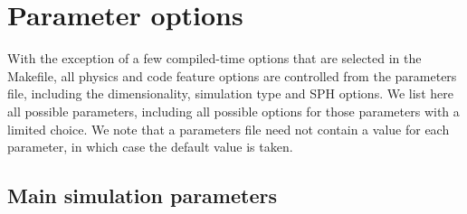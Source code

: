 \documentclass[a4paper]{article}
\begin{document}
\newpage



\section{Parameter options}

\noindent With the exception of a few compiled-time options that are selected in the Makefile, all physics and code feature options are controlled from the parameters file, including the dimensionality, simulation type and SPH options.  We list here all possible parameters, including all possible options for those parameters with a limited choice.  We note that a parameters file need not contain a value for each parameter, in which case the default value is taken.


\subsection{Main simulation parameters}
\end{document}
